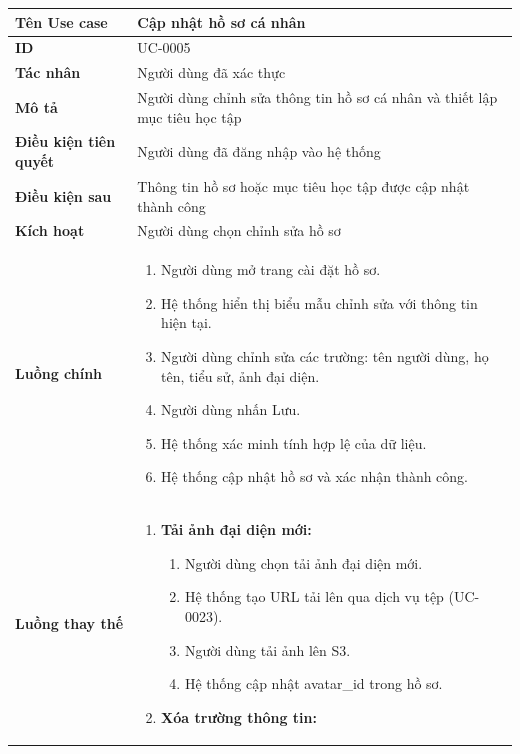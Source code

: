 {
\small
\renewcommand{\arraystretch}{1.15}

\begin{tabularx}{\textwidth}{|>{\raggedright\arraybackslash}p{3.5cm}|>{\raggedright\arraybackslash}X|}
\hline
\textbf{Tên Use case} & Cập nhật hồ sơ cá nhân \\
\hline
\textbf{ID} & UC-0005 \\
\hline
\textbf{Tác nhân} & Người dùng đã xác thực \\
\hline
\textbf{Mô tả} & Người dùng chỉnh sửa thông tin hồ sơ cá nhân và thiết lập mục tiêu học tập \\
\hline
\textbf{Điều kiện tiên quyết} & Người dùng đã đăng nhập vào hệ thống \\
\hline
\textbf{Điều kiện sau} & Thông tin hồ sơ hoặc mục tiêu học tập được cập nhật thành công \\
\hline
\textbf{Kích hoạt} & Người dùng chọn chỉnh sửa hồ sơ \\
\hline
\textbf{Luồng chính} &
\begin{enumerate}
    \item Người dùng mở trang cài đặt hồ sơ.
    \item Hệ thống hiển thị biểu mẫu chỉnh sửa với thông tin hiện tại.
    \item Người dùng chỉnh sửa các trường: tên người dùng, họ tên, tiểu sử, ảnh đại diện.
    \item Người dùng nhấn Lưu.
    \item Hệ thống xác minh tính hợp lệ của dữ liệu.
    \item Hệ thống cập nhật hồ sơ và xác nhận thành công.
\end{enumerate} \\
\hline
\textbf{Luồng thay thế} &
\begin{enumerate}
    \item \textbf{Tải ảnh đại diện mới:}
    \begin{enumerate}
        \item[3A.] Người dùng chọn tải ảnh đại diện mới.
        \item[4A.] Hệ thống tạo URL tải lên qua dịch vụ tệp (UC-0023).
        \item[5A.] Người dùng tải ảnh lên S3.
        \item[6A.] Hệ thống cập nhật avatar\_id trong hồ sơ.
    \end{enumerate}
    \item \textbf{Xóa trường thông tin:}
    \begin{enumerate}

\end{enumerate}
\end{enumerate}
\end{tabularx}}

